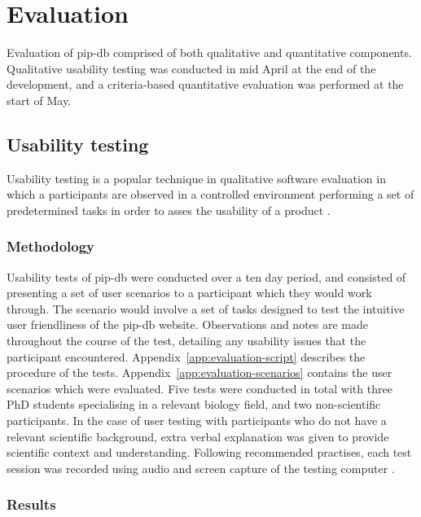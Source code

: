 \chapter{Evaluation}\label{chap:evaluation}

Evaluation of pip-db comprised of both qualitative and quantitative
components. Qualitative usability testing was conducted in mid April
at the end of the development, and a criteria-based quantitative
evaluation was performed at the start of May.

\section{Usability testing}\label{sec:usability-testing}

Usability testing is a popular technique in qualitative software
evaluation in which a participants are observed in a controlled
environment performing a set of predetermined tasks in order to asses
the usability of a product \cite{rubin2008handbook}.

\subsection{Methodology}

Usability tests of pip-db were conducted over a ten day period, and
consisted of presenting a set of user scenarios to a participant which
they would work through. The scenario would involve a set of tasks
designed to test the intuitive user friendliness of the pip-db
website. Observations and notes are made throughout the course of the
test, detailing any usability issues that the participant encountered.
Appendix~\ref{app:evaluation-script} describes the procedure of the
tests. Appendix~\ref{app:evaluation-scenarios} contains the user
scenarios which were evaluated. Five tests were conducted in total
with three PhD students specialising in a relevant biology field, and
two non-scientific participants. In the case of user testing with
participants who do not have a relevant scientific background, extra
verbal explanation was given to provide scientific context and
understanding. Following recommended practises, each test session was
recorded using audio and screen capture of the testing computer
\cite{dumas1999practical}.

\subsection{Results}

